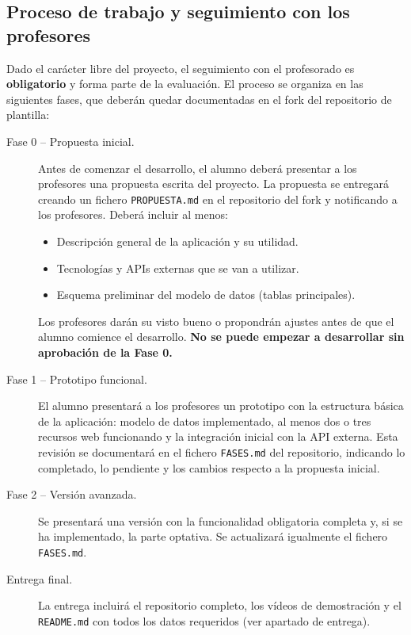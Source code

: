 \subsection{Proceso de trabajo y seguimiento con los profesores}
\label{sec:practica-2026-05-ltaw:fases}

Dado el carácter libre del proyecto, el seguimiento con el profesorado es \textbf{obligatorio} y forma parte de la evaluación. El proceso se organiza en las siguientes fases, que deberán quedar documentadas en el fork del repositorio de plantilla:

\begin{description}

\item[Fase 0 -- Propuesta inicial.] Antes de comenzar el desarrollo, el alumno deberá presentar a los profesores una propuesta escrita del proyecto. La propuesta se entregará creando un fichero \texttt{PROPUESTA.md} en el repositorio del fork y notificando a los profesores. Deberá incluir al menos:
  \begin{itemize}
    \item Descripción general de la aplicación y su utilidad.
    \item Tecnologías y APIs externas que se van a utilizar.
    \item Esquema preliminar del modelo de datos (tablas principales).
  \end{itemize}
  Los profesores darán su visto bueno o propondrán ajustes antes de que el alumno comience el desarrollo. \textbf{No se puede empezar a desarrollar sin aprobación de la Fase 0.}

\item[Fase 1 -- Prototipo funcional.] El alumno presentará a los profesores un prototipo con la estructura básica de la aplicación: modelo de datos implementado, al menos dos o tres recursos web funcionando y la integración inicial con la API externa. Esta revisión se documentará en el fichero \texttt{FASES.md} del repositorio, indicando lo completado, lo pendiente y los cambios respecto a la propuesta inicial.

\item[Fase 2 -- Versión avanzada.] Se presentará una versión con la funcionalidad obligatoria completa y, si se ha implementado, la parte optativa. Se actualizará igualmente el fichero \texttt{FASES.md}.

\item[Entrega final.] La entrega incluirá el repositorio completo, los vídeos de demostración y el \texttt{README.md} con todos los datos requeridos (ver apartado de entrega).

\end{description}

